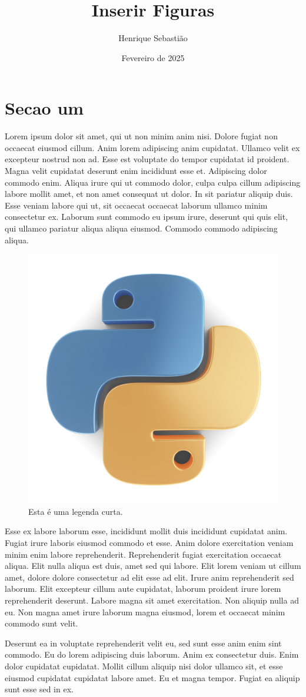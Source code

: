 \documentclass{article}
\begin{document}
\title{\textbf{\Huge Inserir Figuras}}
\author{Henrique Sebastião}
\date{Fevereiro de 2025}
\maketitle

\newpage

\tableofcontents

\newpage

\listoffigures

\newpage

\section{Secao um}

Lorem ipsum dolor sit amet, qui ut non minim anim nisi. Dolore fugiat
non occaecat eiusmod cillum.
Anim lorem adipiscing anim cupidatat. Ullamco velit ex excepteur
nostrud non ad. Esse est voluptate do tempor cupidatat id proident.
Magna velit cupidatat deserunt enim incididunt esse et. Adipiscing
dolor commodo enim.
Aliqua irure qui ut commodo dolor, culpa culpa cillum adipiscing
labore mollit amet, et non amet consequat ut dolor.
In sit pariatur aliquip duis. Esse veniam labore qui ut, sit occaecat
occaecat laborum ullamco minim consectetur ex.
Laborum sunt commodo eu ipsum irure, deserunt qui quis elit, qui
ullamco pariatur aliqua aliqua eiusmod. Commodo commodo adipiscing aliqua.

\begin{figure}[H]
  \centering
  \includegraphics[width=0.4\linewidth]{../figures/python.jpg}
  \caption[Python]{Esta é uma legenda curta.}
  \label{fig:pyton1}
\end{figure}

Esse ex labore laborum esse, incididunt mollit duis incididunt
cupidatat anim. Fugiat irure laboris eiusmod commodo et esse. Anim
dolore exercitation veniam minim enim labore reprehenderit.
Reprehenderit fugiat exercitation occaecat aliqua. Elit nulla aliqua
est duis, amet sed qui labore.
Elit lorem veniam ut cillum amet, dolore dolore consectetur ad elit
esse ad elit. Irure anim reprehenderit sed laborum.
Elit excepteur cillum aute cupidatat, laborum proident irure lorem
reprehenderit deserunt. Labore magna sit amet exercitation.
Non aliquip nulla ad eu. Non magna amet irure laborum magna eiusmod,
lorem et occaecat minim commodo sunt velit.

Deserunt ea in voluptate reprehenderit velit eu, sed sunt esse anim
enim sint commodo.
Eu do lorem adipiscing duis laborum. Anim ex consectetur duis. Enim
dolor cupidatat cupidatat.
Mollit cillum aliquip nisi dolor ullamco sit, et esse eiusmod
cupidatat cupidatat labore amet. Eu et magna tempor.
Fugiat ea aliquip sunt esse sed in ex.
\end{document}
